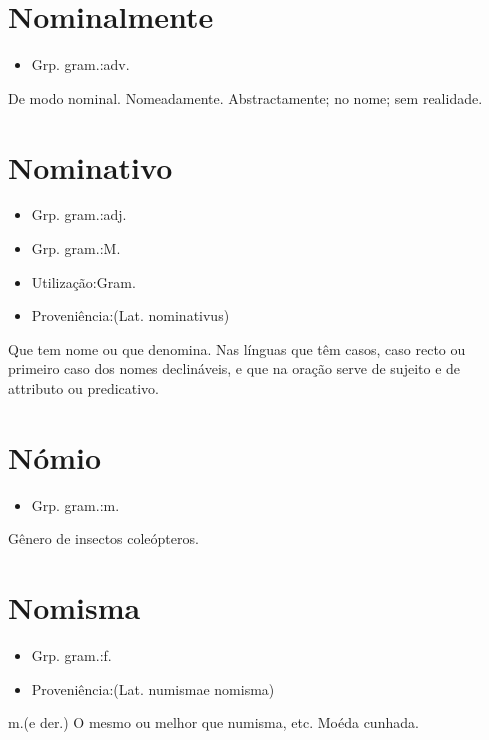 \section{Nominalmente}
\begin{itemize}
\item {Grp. gram.:adv.}
\end{itemize}
De modo nominal.
Nomeadamente.
Abstractamente; no nome; sem realidade.
\section{Nominativo}
\begin{itemize}
\item {Grp. gram.:adj.}
\end{itemize}
\begin{itemize}
\item {Grp. gram.:M.}
\end{itemize}
\begin{itemize}
\item {Utilização:Gram.}
\end{itemize}
\begin{itemize}
\item {Proveniência:(Lat. \textunderscore nominativus\textunderscore )}
\end{itemize}
Que tem nome ou que denomina.
Nas línguas que têm casos, caso recto ou primeiro caso dos nomes declináveis, e que na oração serve de sujeito e de attributo ou predicativo.
\section{Nómio}
\begin{itemize}
\item {Grp. gram.:m.}
\end{itemize}
Gênero de insectos coleópteros.
\section{Nomisma}
\begin{itemize}
\item {Grp. gram.:f.}
\end{itemize}
\begin{itemize}
\item {Proveniência:(Lat. \textunderscore numisma\textunderscore  e \textunderscore nomisma\textunderscore )}
\end{itemize}
\textunderscore m.\textunderscore  (e der.)
O mesmo ou melhor que \textunderscore numisma\textunderscore , etc.
Moéda cunhada.
